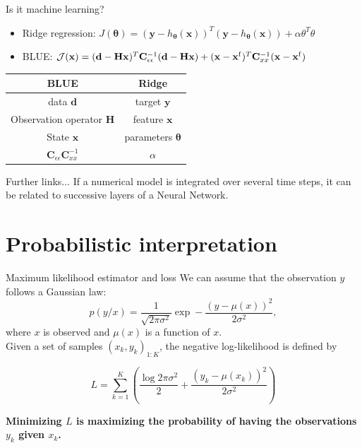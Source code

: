 \documentclass[handout]{beamer}
\begin{document}
\begin{frame}{Is it machine learning?}
\begin{footnotesize}

    \begin{itemize}
        \item Ridge regression: $
J(\bm{\theta}) =(\mathbf{y} - h_{\bm{\theta}}(\mathbf{x}))^T (\mathbf{y} - h_{\bm{\theta}}(\mathbf{x})) + \alpha  \theta^T \theta
$
\item BLUE:  $\mathcal{J}(\mathbf{x}) = 
          (\mathbf{d} - \mathbf{H}\mathbf{x})^T  \mathbf{C}_{\epsilon \epsilon}^{-1}  (\mathbf{d} - \mathbf{H}\mathbf{x}) + (\mathbf{x} - \mathbf{x}^{\rm f})^T \mathbf{C}^{-1}_{xx}(\mathbf{x} - \mathbf{x}^{\rm f})$
    \end{itemize}
    \end{footnotesize}
    \pause
    \begin{table}[]
        \centering
        \begin{tabular}{c|c}
            BLUE & Ridge \\
            \hline
            data $\mathbf{d}$ & target $\mathbf{y}$  \\
            Observation operator $\mathbf{H}$ & feature $\mathbf{x}$ \\
            State $\mathbf{x}$ & parameters $\bm{\theta}$\\
            $\mathbf{C}_{\epsilon \epsilon} \mathbf{C}^{-1}_{xx}$ & $\alpha$
        \end{tabular}
    \end{table}
    \pause
    \begin{block}{Further links...}
    If a numerical model is integrated over several time steps, it can be related to successive layers of a Neural Network.
    \end{block}
\end{frame}


\section{Probabilistic interpretation}
\begin{frame}{Maximum likelihood estimator and loss}
    We can assume that the observation $y$ follows a Gaussian law:
    $$
p(y/x) = \frac{1}{\sqrt{2\pi\sigma^2}}\exp -\frac{(y - \mu(x))^2}{2\sigma^2},
    $$
    where $x$ is observed and $\mu(x)$ is a function of $x$.\\
    
    Given a set of samples $(x_k,y_k)_{1:K}$, the negative log-likelihood is defined by
    
    $$
L = \sum_{k=1}^{K} \left(\frac{\log 2\pi\sigma^2}{2} + \frac{(y_k - \mu(x_k))^2}{2\sigma^2}\right)
$$

\alert{\bf Minimizing $L$ is maximizing the probability of having the observations $y_k$ given $x_k$.}
\end{frame}
\end{document}
